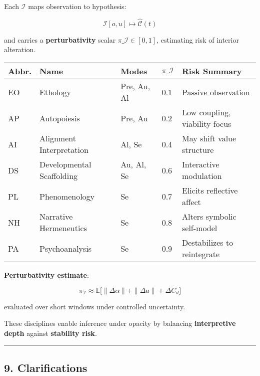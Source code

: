 \documentclass[
]{article}
\begin{document}
Each \(\mathcal{I}\) maps observation to hypothesis:

\[ \mathcal{I}[o,u] \mapsto \hat{\mathcal{C}}(t) \]

and carries a \textbf{perturbativity} scalar
\(\pi\_{\mathcal{I}} \in [0,1]\), estimating risk of interior
alteration.

\begin{longtable}[]{@{}lllll@{}}
\toprule\noalign{}
Abbr. & Name & Modes & \(\pi\_{\mathcal{I}}\) & Risk Summary \\
\midrule\noalign{}
\endhead
\bottomrule\noalign{}
\endlastfoot
EO & Ethology & Pre, Au, Al & 0.1 & Passive observation \\
AP & Autopoiesis & Pre, Au & 0.2 & Low coupling, viability focus \\
AI & Alignment Interpretation & Al, Se & 0.4 & May shift value
structure \\
DS & Developmental Scaffolding & Au, Al, Se & 0.6 & Interactive
modulation \\
PL & Phenomenology & Se & 0.7 & Elicits reflective affect \\
NH & Narrative Hermeneutics & Se & 0.8 & Alters symbolic self-model \\
PA & Psychoanalysis & Se & 0.9 & Destabilizes to reintegrate \\
\end{longtable}

\textbf{Perturbativity estimate}:

\[ \pi_{\mathcal{I}} \approx \mathbb{E}\bigl[\|\Delta \alpha\| + \|\Delta a\| + \Delta C_d\bigr] \]

evaluated over short windows under controlled uncertainty.

These disciplines enable inference under opacity by balancing
\textbf{interpretive depth} against \textbf{stability risk}.

\begin{center}\rule{0.5\linewidth}{0.5pt}\end{center}

\hypertarget{9-clarifications}{%
\subsection{9. Clarifications}\label{9-clarifications}}
\end{document}
